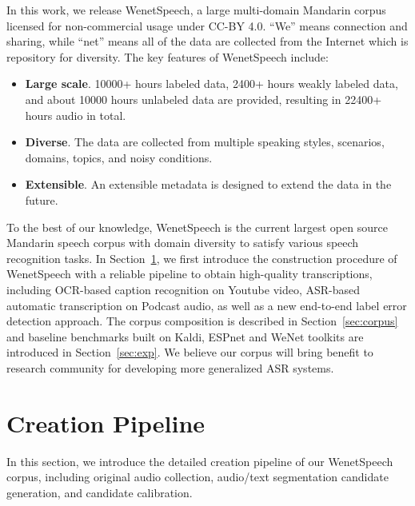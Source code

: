 \documentclass{article}
\begin{document}
In this work, we release WenetSpeech, a large multi-domain Mandarin corpus licensed for non-commercial usage under CC-BY 4.0. ``We'' means connection and sharing, while ``net'' means all of the data are collected from the Internet which is repository for diversity. The key features of WenetSpeech include:

\vspace{-0.5em}
\begin{itemize}
\item \textbf{Large scale}. 10000+ hours labeled data, 2400+ hours weakly labeled data, and about 10000 hours unlabeled data are provided, resulting in 22400+ hours audio in total.
\vspace{-0.2em}
\item \textbf{Diverse}. The data are collected from multiple speaking styles, scenarios, domains, topics, and noisy conditions.
\vspace{-0.2em}
\item \textbf{Extensible}. An extensible metadata is designed to extend the data in the future.
\end{itemize}
\vspace{-0.5em}



To the best of our knowledge, WenetSpeech is the current largest open source Mandarin speech corpus with domain diversity to satisfy various speech recognition tasks. In Section~\ref{sec:pipeline}, we first introduce the construction procedure of WenetSpeech with a reliable pipeline to obtain high-quality transcriptions, including OCR-based caption recognition on Youtube video, ASR-based automatic transcription on Podcast audio, as well as a new end-to-end label error detection approach. The corpus composition is described in Section~\ref{sec:corpus} and baseline benchmarks built on Kaldi, ESPnet and WeNet toolkits are introduced in Section~\ref{sec:exp}. We believe our corpus will bring benefit to research community for developing more generalized ASR systems.

\vspace{-1em}
\section{Creation Pipeline}\label{sec:pipeline}
\vspace{-1em}
In this section, we introduce the detailed creation pipeline of our WenetSpeech corpus, including original audio collection, audio/text segmentation candidate generation, and candidate calibration.
\end{document}
